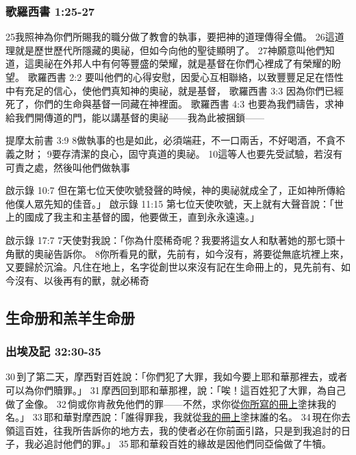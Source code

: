 \subsubsection{歌羅西書 1:25-27}
25我照神為你們所賜我的職分做了教會的執事，要把神的道理傳得全備。 26這道理就是歷世歷代所隱藏的奧祕，但如今向他的聖徒顯明了。 27神願意叫他們知道，這奧祕在外邦人中有何等豐盛的榮耀，就是基督在你們心裡成了有榮耀的盼望。
歌羅西書 2:2
要叫他們的心得安慰，因愛心互相聯絡，以致豐豐足足在悟性中有充足的信心，使他們真知神的奧祕，就是基督，
歌羅西書 3:3
因為你們已經死了，你們的生命與基督一同藏在神裡面。
歌羅西書 4:3
也要為我們禱告，求神給我們開傳道的門，能以講基督的奧祕——我為此被捆鎖——

提摩太前書 3:9
8做執事的也是如此，必須端莊，不一口兩舌，不好喝酒，不貪不義之財； 9要存清潔的良心，固守真道的奧祕。 10這等人也要先受試驗，若沒有可責之處，然後叫他們做執事

啟示錄 10:7
但在第七位天使吹號發聲的時候，神的奧祕就成全了，正如神所傳給他僕人眾先知的佳音。」
啟示錄 11:15
第七位天使吹號，天上就有大聲音說：「世上的國成了我主和主基督的國，他要做王，直到永永遠遠。」

啟示錄 17:7
7天使對我說：「你為什麼稀奇呢？我要將這女人和馱著她的那七頭十角獸的奧祕告訴你。 8你所看見的獸，先前有，如今沒有，將要從無底坑裡上來，又要歸於沉淪。凡住在地上，名字從創世以來沒有記在生命冊上的，見先前有、如今沒有、以後再有的獸，就必稀奇



\subsection{生命册和羔羊生命册}

\subsubsection{出埃及記 32:30-35}
30 到了第二天，摩西對百姓說：「你們犯了大罪，我如今要上耶和華那裡去，或者可以為你們贖罪。」 31 摩西回到耶和華那裡，說：「唉！這百姓犯了大罪，為自己做了金像。 32 倘或你肯赦免他們的罪——不然，求你從\underline{你所寫的冊上}塗抹我的名。」 33 耶和華對摩西說：「誰得罪我，我就從\underline{我的冊上}塗抹誰的名。 34 現在你去領這百姓，往我所告訴你的地方去，我的使者必在你前面引路，只是到我追討的日子，我必追討他們的罪。」 35 耶和華殺百姓的緣故是因他們同亞倫做了牛犢。

